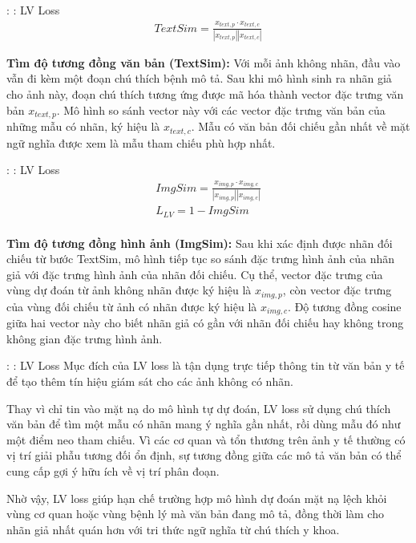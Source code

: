 \begin{frame}{\secname: \subsecname: LV Loss}
    \begin{align*}
        TextSim = \frac{x_{text, p} \cdot x_{text, c}}{|x_{text, p}||x_{text, c}|}
    \end{align*}
    
    \textbf{Tìm độ tương đồng văn bản (TextSim):} Với mỗi ảnh không nhãn, đầu vào vẫn đi kèm một đoạn chú thích bệnh mô tả. Sau khi mô hình sinh ra nhãn giả cho ảnh này, đoạn chú thích tương ứng được mã hóa thành vector đặc trưng văn bản $x_{text,p}$. Mô hình so sánh vector này với các vector đặc trưng văn bản của những mẫu có nhãn, ký hiệu là $x_{text,c}$. Mẫu có văn bản đối chiếu gần nhất về mặt ngữ nghĩa được xem là mẫu tham chiếu phù hợp nhất.
    
\end{frame}

\begin{frame}{\secname: \subsecname: LV Loss}
    \begin{align*}
        ImgSim = \frac{x_{img, p} \cdot x_{img, c}}{|x_{img, p}||x_{img, c}|} \\
        L_{LV} = 1 - ImgSim \\
    \end{align*}
    
    \textbf{Tìm độ tương đồng hình ảnh (ImgSim):} Sau khi xác định được nhãn đối chiếu từ bước TextSim, mô hình tiếp tục so sánh đặc trưng hình ảnh của nhãn giả với đặc trưng hình ảnh của nhãn đối chiếu. Cụ thể, vector đặc trưng của vùng dự đoán từ ảnh không nhãn được ký hiệu là $x_{img,p}$, còn vector đặc trưng của vùng đối chiếu từ ảnh có nhãn được ký hiệu là $x_{img,c}$. Độ tương đồng cosine giữa hai vector này cho biết nhãn giả có gần với nhãn đối chiếu hay không trong không gian đặc trưng hình ảnh.
\end{frame}

\begin{frame}{\secname: \subsecname: LV Loss}
    Mục đích của LV loss là tận dụng trực tiếp thông tin từ văn bản y tế để tạo thêm tín hiệu giám sát cho các ảnh không có nhãn.
    
    \bigskip
    Thay vì chỉ tin vào mặt nạ do mô hình tự dự đoán, LV loss sử dụng chú thích văn bản để tìm một mẫu có nhãn mang ý nghĩa gần nhất, rồi dùng mẫu đó như một điểm neo tham chiếu. Vì các cơ quan và tổn thương trên ảnh y tế thường có vị trí giải phẫu tương đối ổn định, sự tương đồng giữa các mô tả văn bản có thể cung cấp gợi ý hữu ích về vị trí phân đoạn.
    
    \bigskip
    Nhờ vậy, LV loss giúp hạn chế trường hợp mô hình dự đoán mặt nạ lệch khỏi vùng cơ quan hoặc vùng bệnh lý mà văn bản đang mô tả, đồng thời làm cho nhãn giả nhất quán hơn với tri thức ngữ nghĩa từ chú thích y khoa.
\end{frame}

